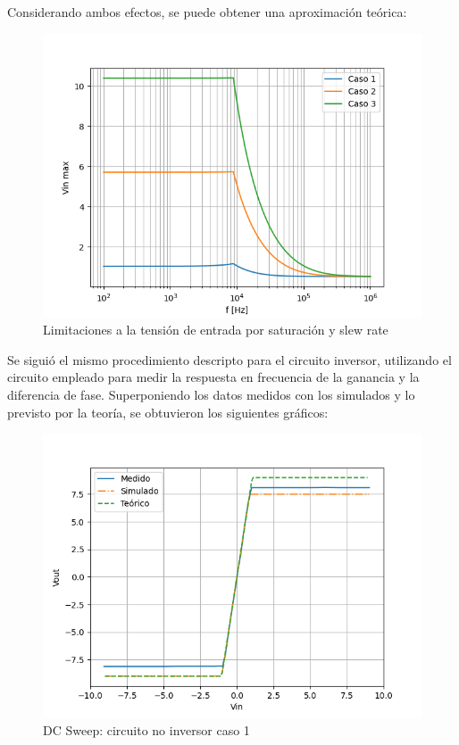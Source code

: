 Considerando ambos efectos, se puede obtener una aproximación teórica:

\begin{figure}[H]
	\centering
	\includegraphics[scale=0.5]{./Imagenes/NOInvVinMin.png}
	\caption{Limitaciones a la tensión de entrada por saturación y slew rate}
	\label{fig:circinvcaso1}
\end{figure}


Se siguió el mismo procedimiento descripto para el circuito inversor, utilizando el circuito empleado para medir la respuesta en frecuencia de la ganancia y la diferencia de fase. Superponiendo los datos medidos con los simulados y lo previsto por la teoría, se obtuvieron los siguientes gráficos:

\begin{figure}[H]
	\centering
	\includegraphics[scale=0.5]{./Imagenes/NoInvCaso1DC.png}
	\caption{DC Sweep: circuito no inversor caso 1}
	\label{fig:circinvcaso1}
\end{figure}


